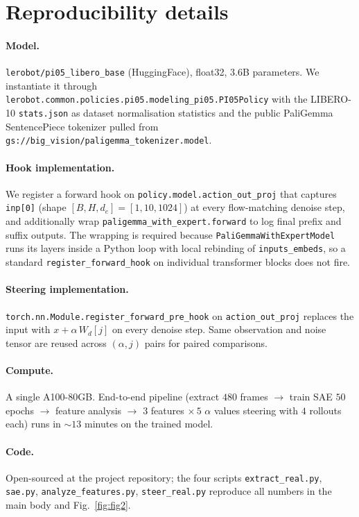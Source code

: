 \section{Reproducibility details}
\label{app:repro}

\paragraph{Model.}
\texttt{lerobot/pi05\_libero\_base} (HuggingFace), float32, $3.6$B parameters.
We instantiate it through \texttt{lerobot.common.policies.pi05.modeling\_pi05.PI05Policy}
with the LIBERO-10 \texttt{stats.json} as dataset normalisation statistics
and the public PaliGemma SentencePiece tokenizer pulled from
\texttt{gs://big\_vision/paligemma\_tokenizer.model}.

\paragraph{Hook implementation.}
We register a forward hook on \texttt{policy.model.action\_out\_proj} that
captures \texttt{inp[0]} (shape $[B,H,d_e]{=}[1,10,1024]$) at every flow-matching
denoise step, and additionally wrap \texttt{paligemma\_with\_expert.forward} to
log final prefix and suffix outputs. The wrapping is required because
\texttt{PaliGemmaWithExpertModel} runs its layers inside a Python loop with
local rebinding of \texttt{inputs\_embeds}, so a standard
\texttt{register\_forward\_hook} on individual transformer blocks does not fire.

\paragraph{Steering implementation.}
\texttt{torch.nn.Module.register\_forward\_pre\_hook} on
\texttt{action\_out\_proj} replaces the input with $x + \alpha\,W_d[j]$
on every denoise step. Same observation and noise tensor are reused across
$(\alpha,j)$ pairs for paired comparisons.

\paragraph{Compute.}
A single A100-80GB. End-to-end pipeline (extract $480$ frames $\rightarrow$
train SAE $50$ epochs $\rightarrow$ feature analysis $\rightarrow$ $3$
features $\times\,5$ $\alpha$ values steering with $4$ rollouts each)
runs in $\sim$$13$ minutes on the trained model.

\paragraph{Code.}
Open-sourced at the project repository; the four scripts
\texttt{extract\_real.py}, \texttt{sae.py}, \texttt{analyze\_features.py},
\texttt{steer\_real.py} reproduce all numbers in the main body and
Fig.~\ref{fig:fig2}.
